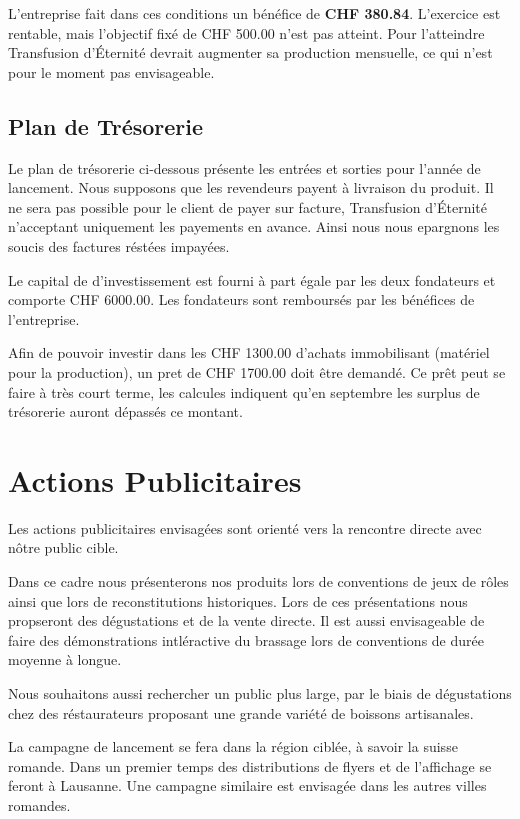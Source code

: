 \documentclass[10pt,a4paper]{article}
\newcommand{\tde}{Transfusion d'Éternité}
\begin{document}
\vspace{0.5cm}
L'entreprise fait dans ces conditions un bénéfice de \textbf{CHF 380.84}.
L'exercice est rentable, mais l'objectif fixé de CHF 500.00 n'est pas atteint.
Pour l'atteindre \tde{} devrait augmenter sa production mensuelle, ce qui n'est pour le moment pas envisageable.
\subsection{Plan de Trésorerie}
Le plan de trésorerie ci-dessous présente les entrées et sorties pour l'année de lancement.
Nous supposons que les revendeurs payent à livraison du produit.
Il ne sera pas possible pour le client de payer sur facture, \tde{} n'acceptant uniquement les payements en avance.
Ainsi nous nous epargnons les soucis des factures réstées impayées.

Le capital de d'investissement est fourni à part égale par les deux fondateurs et comporte CHF 6000.00.
Les fondateurs sont remboursés par les bénéfices de l'entreprise.

Afin de pouvoir investir dans les CHF 1300.00 d'achats immobilisant (matériel pour la production), un pret de CHF 1700.00 doit être demandé.
Ce prêt peut se faire à très court terme, les calcules indiquent qu'en septembre les surplus de trésorerie auront dépassés ce montant.


\section{Actions Publicitaires}
Les actions publicitaires envisagées sont orienté vers la rencontre directe avec nôtre public cible.

Dans ce cadre nous présenterons nos produits lors de conventions de jeux de rôles ainsi que lors de reconstitutions historiques.
Lors de ces présentations nous propseront des dégustations et de la vente directe.
Il est aussi envisageable de faire des démonstrations intléractive du brassage lors de conventions de durée moyenne à longue.

Nous souhaitons aussi rechercher un public plus large, par le biais de dégustations chez des réstaurateurs proposant une grande variété de boissons artisanales.

La campagne de lancement se fera dans la région ciblée, à savoir la suisse romande.
Dans un premier temps des distributions de flyers et de l'affichage se feront à Lausanne.
Une campagne similaire est envisagée dans les autres villes romandes.
\end{document}
